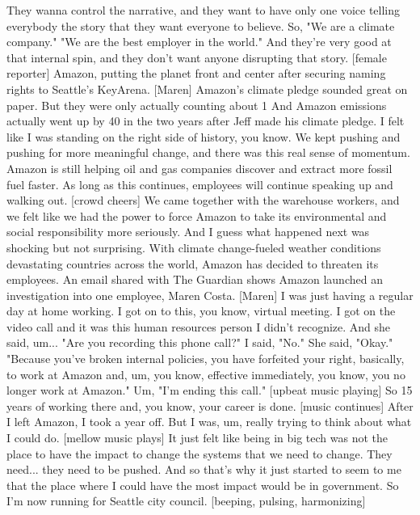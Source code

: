 \documentclass[a4paper]{article}
\begin{document}
	They wanna control the narrative,
	and they want to have only one voice telling everybody
	the story that they want everyone to believe.
	So, "We are a climate company."
	"We are the best employer in the world."
	And they're very good at that internal spin,
	and they don't want anyone disrupting that story.
	[female reporter] Amazon, putting the planet front and center
	after securing naming rights to Seattle's KeyArena.
	[Maren] Amazon's climate pledge sounded great on paper.
	But they were only actually counting
	about 1%
	And Amazon emissions actually went up by 40%
	in the two years after Jeff made his climate pledge.
	I felt like I was standing on the right side of history, you know.
	We kept pushing and pushing for more meaningful change,
	and there was this real sense of momentum.
	Amazon is still helping oil and gas companies
	discover and extract more fossil fuel faster.
	As long as this continues, employees will continue speaking up and walking out.
	[crowd cheers]
	We came together with the warehouse workers,
	and we felt like we had the power to force Amazon
	to take its environmental and social responsibility more seriously.
	And I guess what happened next was shocking
	but not surprising.
	With climate change-fueled weather conditions
	devastating countries across the world,
	Amazon has decided to threaten its employees.
	An email shared with The Guardian shows Amazon launched an investigation
	into one employee, Maren Costa.
	[Maren] I was just having a regular day at home working.
	I got on to this, you know, virtual meeting.
	I got on the video call
	and it was this human resources person
	I didn't recognize.
	And she said, um...
	"Are you recording this phone call?"
	I said, "No." She said, "Okay."
	"Because you've broken internal policies, you have forfeited your right,
	basically, to work at Amazon
	and, um, you know, effective immediately,
	you know, you no longer work at Amazon."
	Um, "I'm ending this call."
	[upbeat music playing]
	So 15 years of working there and, you know, your career is done.
	[music continues]
	After I left Amazon, I took a year off.
	But I was, um, really trying to think about what I could do.
	[mellow music plays]
	It just felt like
	being in big tech
	was not the place to have the impact to change the systems
	that we need to change.
	They need... they need to be pushed.
	And so that's why
	it just started to seem to me that
	the place where I could have the most impact would be in government.
	So I'm now running for Seattle city council.
	[beeping, pulsing, harmonizing]
\end{document}
